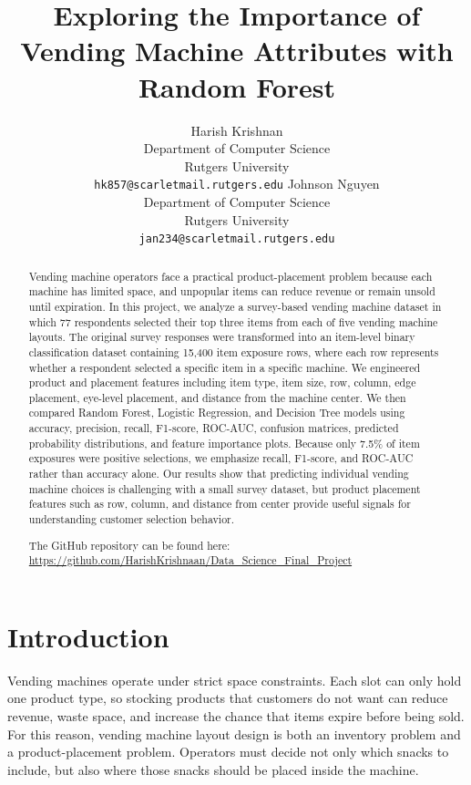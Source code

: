 \documentclass{article}
\title{Exploring the Importance of Vending Machine Attributes with Random Forest}
\author{%
  Harish Krishnan \\
  Department of Computer Science\\
  Rutgers University\\
  \texttt{hk857@scarletmail.rutgers.edu}
  \AND
  Johnson Nguyen \\
  Department of Computer Science\\
  Rutgers University\\
  \texttt{jan234@scarletmail.rutgers.edu}
}
\begin{document}
\maketitle


\begin{abstract}
Vending machine operators face a practical product-placement problem because each machine has limited space, and unpopular items can reduce revenue or remain unsold until expiration. In this project, we analyze a survey-based vending machine dataset in which 77 respondents selected their top three items from each of five vending machine layouts. The original survey responses were transformed into an item-level binary classification dataset containing 15,400 item exposure rows, where each row represents whether a respondent selected a specific item in a specific machine. We engineered product and placement features including item type, item size, row, column, edge placement, eye-level placement, and distance from the machine center. We then compared Random Forest, Logistic Regression, and Decision Tree models using accuracy, precision, recall, F1-score, ROC-AUC, confusion matrices, predicted probability distributions, and feature importance plots. Because only 7.5\% of item exposures were positive selections, we emphasize recall, F1-score, and ROC-AUC rather than accuracy alone. Our results show that predicting individual vending machine choices is challenging with a small survey dataset, but product placement features such as row, column, and distance from center provide useful signals for understanding customer selection behavior.

The GitHub repository can be found here: \url{https://github.com/HarishKrishnaan/Data_Science_Final_Project}
\end{abstract}



\section{Introduction}

Vending machines operate under strict space constraints. Each slot can only hold one product type, so stocking products that customers do not want can reduce revenue, waste space, and increase the chance that items expire before being sold. For this reason, vending machine layout design is both an inventory problem and a product-placement problem. Operators must decide not only which snacks to include, but also where those snacks should be placed inside the machine.
\end{document}
